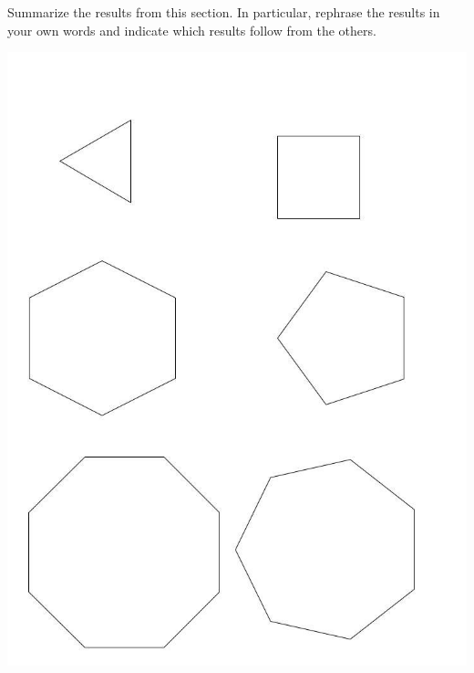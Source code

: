 \documentclass[newpage,hints,handout]{ximera}
\begin{document}
\begin{problem}
 Summarize the results from this section. In particular, rephrase the results in your own words and indicate which results follow from the others.
\end{problem}
\includegraphics[width=\textwidth]{RegularPolyhedra}
\end{document}
